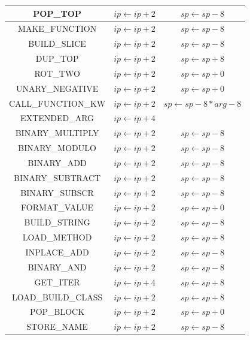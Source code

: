 \documentclass[english]{article}
\begin{document}
\begin{figure}[htp]
	\centering
	\begin{tabular}{|c|c|c|}
		\hline
		POP\_TOP & $ip \leftarrow ip + 2$ & $sp \leftarrow sp - 8$\\
		\hline
		MAKE\_FUNCTION & $ip \leftarrow ip + 2$ & $sp \leftarrow sp - 8$\\
		\hline
		BUILD\_SLICE & $ip \leftarrow ip + 2$ & $sp \leftarrow sp - 8$\\
		\hline
		DUP\_TOP & $ip \leftarrow ip + 2$ & $sp \leftarrow sp + 8$\\
		\hline
		ROT\_TWO & $ip \leftarrow ip + 2$ & $sp \leftarrow sp + 0$\\
		\hline
		UNARY\_NEGATIVE & $ip \leftarrow ip + 2$ & $sp \leftarrow sp + 0$\\
		\hline
		CALL\_FUNCTION\_KW & $ip \leftarrow ip + 2$ & $sp \leftarrow sp - 8*arg - 8$\\
		\hline
		EXTENDED\_ARG & $ip \leftarrow ip + 4$ & \\
		\hline
		BINARY\_MULTIPLY & $ip \leftarrow ip + 2$ & $sp \leftarrow sp - 8$\\
		\hline
		BINARY\_MODULO & $ip \leftarrow ip + 2$ & $sp \leftarrow sp - 8$\\
		\hline
		BINARY\_ADD & $ip \leftarrow ip + 2$ & $sp \leftarrow sp - 8$\\
		\hline
		BINARY\_SUBTRACT & $ip \leftarrow ip + 2$ & $sp \leftarrow sp - 8$\\
		\hline
		BINARY\_SUBSCR & $ip \leftarrow ip + 2$ & $sp \leftarrow sp - 8$\\
		\hline
		FORMAT\_VALUE & $ip \leftarrow ip + 2$ & $sp \leftarrow sp + 0$\\
		\hline
		BUILD\_STRING & $ip \leftarrow ip + 2$ & $sp \leftarrow sp - 8$\\
		\hline
		LOAD\_METHOD & $ip \leftarrow ip + 2$ & $sp \leftarrow sp + 8$\\
		\hline
		INPLACE\_ADD & $ip \leftarrow ip + 2$ & $sp \leftarrow sp - 8$\\
		\hline
		BINARY\_AND & $ip \leftarrow ip + 2$ & $sp \leftarrow sp - 8$\\
		\hline
		GET\_ITER & $ip \leftarrow ip + 4$ & $sp \leftarrow sp + 8$\\
		\hline
		LOAD\_BUILD\_CLASS & $ip \leftarrow ip + 2$ & $sp \leftarrow sp + 8$\\
		\hline
		POP\_BLOCK & $ip \leftarrow ip + 2$ & $sp \leftarrow sp + 0$\\
		\hline
		STORE\_NAME & $ip \leftarrow ip + 2$ & $sp \leftarrow sp - 8$\\

\end{tabular}
\end{figure}
\end{document}
